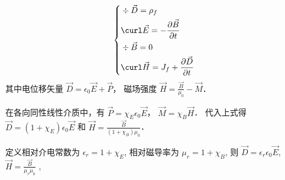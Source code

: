 \begin{equation}
\left\{\begin{aligned}
&\div\vec D = \rho_f\\
&\curl\vec E = -\frac{\partial\vec B}{\partial t}\\
&\div\vec B = 0\\
&\curl\vec H = J_f + \frac{\partial\vec D}{\partial t}
\end{aligned} \right.
\end{equation}
其中电位移矢量 $\vec D = {\epsilon _0}\vec E + \vec P$，  磁场强度 $\vec H = \frac{\vec B}{\mu _0} - \vec M$．

在各向同性线性介质中，有 $\vec P = {\chi _E}{\epsilon _0}\vec E$，  $\vec M = {\chi _B}\vec H$．  代入上式得 $\vec D = (1 + \chi _E)\epsilon _0\vec E$
  和  $\vec H = \frac{\vec B}{(1 + \chi _B)\mu_0}$． 

定义相对介电常数为 $\epsilon _r = 1 + \chi _E$, 相对磁导率为 $\mu _r = 1 + \chi _B$, 则 $\vec D = \epsilon _r\epsilon _0\vec E$, $\vec H = \frac{\vec B}{\mu _r\mu _0}$
 ,  
